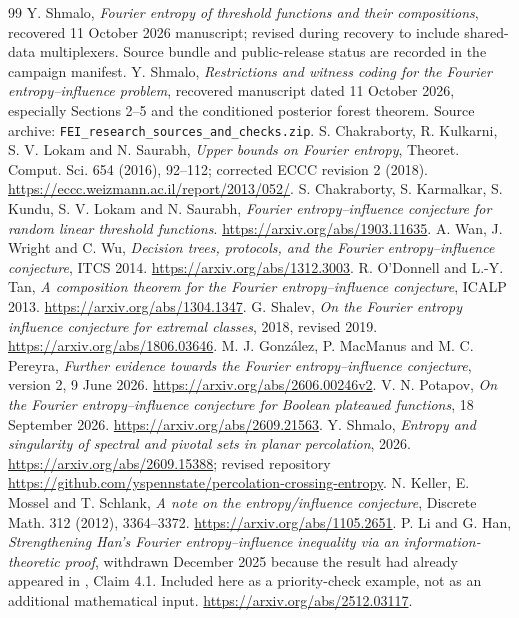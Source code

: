 \documentclass[11pt]{article}
\begin{document}
\begin{thebibliography}{99}
 Y. Shmalo, \emph{Fourier entropy of threshold functions and their compositions}, recovered 11 October 2026 manuscript; revised during recovery to include shared-data multiplexers. Source bundle and public-release status are recorded in the campaign manifest.
 Y. Shmalo, \emph{Restrictions and witness coding for the Fourier entropy--influence problem}, recovered manuscript dated 11 October 2026, especially Sections 2--5 and the conditioned posterior forest theorem. Source archive: \texttt{FEI\_research\_sources\_and\_checks.zip}.
 S. Chakraborty, R. Kulkarni, S. V. Lokam and N. Saurabh, \emph{Upper bounds on Fourier entropy}, Theoret. Comput. Sci. 654 (2016), 92--112; corrected ECCC revision 2 (2018). \url{https://eccc.weizmann.ac.il/report/2013/052/}.
 S. Chakraborty, S. Karmalkar, S. Kundu, S. V. Lokam and N. Saurabh, \emph{Fourier entropy--influence conjecture for random linear threshold functions}. \url{https://arxiv.org/abs/1903.11635}.
 A. Wan, J. Wright and C. Wu, \emph{Decision trees, protocols, and the Fourier entropy--influence conjecture}, ITCS 2014. \url{https://arxiv.org/abs/1312.3003}.
 R. O'Donnell and L.-Y. Tan, \emph{A composition theorem for the Fourier entropy--influence conjecture}, ICALP 2013. \url{https://arxiv.org/abs/1304.1347}.
 G. Shalev, \emph{On the Fourier entropy influence conjecture for extremal classes}, 2018, revised 2019. \url{https://arxiv.org/abs/1806.03646}.
 M. J. Gonz\'alez, P. MacManus and M. C. Pereyra, \emph{Further evidence towards the Fourier entropy--influence conjecture}, version 2, 9 June 2026. \url{https://arxiv.org/abs/2606.00246v2}.
 V. N. Potapov, \emph{On the Fourier entropy--influence conjecture for Boolean plateaued functions}, 18 September 2026. \url{https://arxiv.org/abs/2609.21563}.
 Y. Shmalo, \emph{Entropy and singularity of spectral and pivotal sets in planar percolation}, 2026. \url{https://arxiv.org/abs/2609.15388}; revised repository \url{https://github.com/yspennstate/percolation-crossing-entropy}.
 N. Keller, E. Mossel and T. Schlank, \emph{A note on the entropy/influence conjecture}, Discrete Math. 312 (2012), 3364--3372. \url{https://arxiv.org/abs/1105.2651}.
 P. Li and G. Han, \emph{Strengthening Han's Fourier entropy--influence inequality via an information-theoretic proof}, withdrawn December 2025 because the result had already appeared in \cite{KMS}, Claim 4.1. Included here as a priority-check example, not as an additional mathematical input. \url{https://arxiv.org/abs/2512.03117}.

\end{thebibliography}
\end{document}

